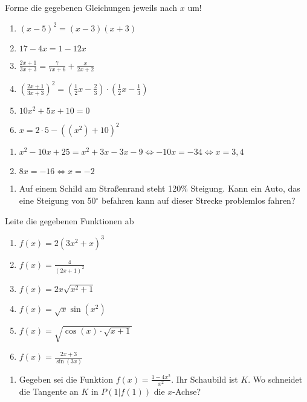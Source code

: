 Forme die gegebenen Gleichungen jeweils nach $x$ um!
\begin{multicols}{2}
	\begin{enumerate}
		\item $(x-5)^2=(x-3)(x+3)$
		\item $17-4x=1-12x$
		\item $\displaystyle\frac{2x+1}{3x+3}=\frac{7}{7x+6}+\frac{x}{2x+2}$
		\item $\displaystyle\left(\frac{2x+1}{3x+3}\right)^2=\left(\frac 1 2 x - \frac 2 3\right)\cdot\left(\frac 1 2 x-\frac 1 3\right)$
		\item $10x^2+5x+10 = 0$
		\item $x=2\cdot 5-((x^2)+10)^2$
	\end{enumerate}
\end{multicols}

\begin{lsg}{}
	\begin{enumerate}
		\item $x^2-10x+25=x^2+3x-3x-9 \Leftrightarrow -10x=-34 \Leftrightarrow x=3,4$
		\item $8x=-16 \Leftrightarrow x=-2$
	\end{enumerate}
\end{lsg}



\begin{enumerate}
	\item Auf einem Schild am Straßenrand steht 120\% Steigung. Kann ein Auto, das eine Steigung von 50$^{\circ}$ befahren kann auf dieser Strecke problemlos fahren?
\end{enumerate}



 Leite die gegebenen Funktionen ab
\begin{multicols}{3}
  \begin{enumerate}
    \item $f(x) = 2(3x^2+x)^3$
    \item $f(x) = \frac{4}{(2x+1)^2}$
    \item $f(x) = 2x\sqrt{x^2+1}$
    \item $f(x) = \sqrt{x}\sin(x^2)$
    \item $f(x) = \sqrt{\cos(x)\cdot\sqrt{x+1}}$
    \item $f(x) = \frac{2x+3}{\sin(3x)}$
  \end{enumerate}
\end{multicols}

  \begin{enumerate}
    \item Gegeben sei die Funktion $f(x) = \frac{1-4x^2}{x^2}$. Ihr Schaubild ist $K$. Wo schneidet die Tangente an $K$ in $P(1|f(1))$ die $x$-Achse?
  \end{enumerate}


